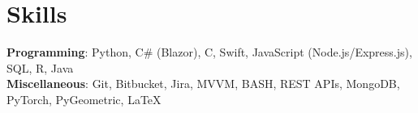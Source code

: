 \documentclass[letterpaper,11pt]{article}
\begin{document}
%
\section{Skills}
 \begin{itemize}[leftmargin=0.15in, label={}]
  \small{
    \item{
     \textbf{Programming}{: Python, C\# (Blazor), C, Swift, JavaScript (Node.js/Express.js), SQL, R, Java} \\
     \textbf{Miscellaneous}{: Git, Bitbucket, Jira, MVVM, BASH, REST APIs, MongoDB, PyTorch, PyGeometric, \LaTeX} \\
    }
  }
 \end{itemize}


\end{document}
